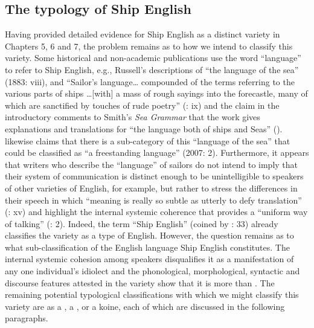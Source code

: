 \subsection{{The typology of Ship English} }%

Having provided detailed evidence for Ship English as a distinct variety in Chapters 5, 6 and 7, the problem remains as to how we intend to classify this variety. Some historical and non-academic publications use the word “language” to refer to Ship English, e.g., Russell’s descriptions of “the language of the sea” (1883: viii), and “Sailor’s language… compounded of the terms referring to the various parts of ships …[with] a mass of rough sayings into the forecastle, many of which are sanctified by touches of rude poetry” (\citealt{Russell1883}: ix) and the claim in the introductory comments to Smith’s \textit{Sea Grammar} that the work gives explanations and translations for “the language both of ships and Seas” (\citealt{Smith1627}). \citeauthor{Choundas2007} likewise claims that there is a sub-category of this “language of the sea” that could be classified as “a freestanding  language” (2007: 2). Furthermore, it appears that writers who describe the “language” of sailors do not intend to imply that their system of communication is distinct enough to be unintelligible to speakers of other varieties of English, for example, but rather to stress the differences in their speech in which “meaning is really so subtle as utterly to defy translation” (\citealt{Russell1883}: xv) and highlight the internal systemic coherence that provides a “uniform way of talking” (\citealt{Choundas2007}: 2). Indeed, the term “Ship English” (coined by \citealt{Hancock1976}: 33) already classifies the variety as a type of English. However, the question remains as to what sub-classification of the English language Ship English constitutes. The internal systemic cohesion among speakers disqualifies it as a manifestation of any one individual’s idiolect and the phonological, morphological, syntactic and discourse features attested in the variety show that it is more than . The remaining potential typological classifications with which we might classify this variety are as a , a , or a koine, each of which are discussed in the following paragraphs. 

